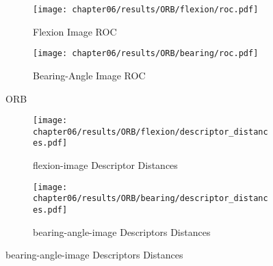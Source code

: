 \begin{figure}[H]
\begin{subfigure}[t]{0.45\linewidth}
    \texttt{[image: chapter06/results/ORB/flexion/roc.pdf]}%
    \caption{Flexion Image ROC}
\end{subfigure}\quad
\begin{subfigure}[t]{0.45\linewidth}
    \texttt{[image: chapter06/results/ORB/bearing/roc.pdf]}
    \caption{Bearing-Angle Image ROC}
\end{subfigure}
    \caption{ORB}
\end{figure}

\begin{figure}[H]
\begin{subfigure}[t]{0.45\linewidth}
    \texttt{[image: chapter06/results/ORB/flexion/descriptor\_distances.pdf]}%
    \caption{\gls{flexion-image} Descriptor Distances}
\end{subfigure}\quad
\begin{subfigure}[t]{0.45\linewidth}
    \texttt{[image: chapter06/results/ORB/bearing/descriptor\_distances.pdf]}%
    \caption{\gls{bearing-angle-image} Descriptors Distances}
\end{subfigure}
\end{figure}
